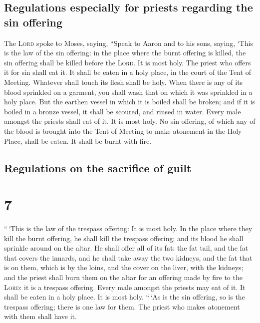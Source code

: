 \hypertarget{regulations-especially-for-priests-regarding-the-sin-offering}{%
\subsection{Regulations especially for priests regarding the sin
offering}\label{regulations-especially-for-priests-regarding-the-sin-offering}}

 The \textsc{Lord} spoke to Moses, saying,
 ``Speak to Aaron and to his sons, saying, `This is the
law of the sin offering: in the place where the burnt offering is
killed, the sin offering shall be killed before the \textsc{Lord}. It is
most holy.  The priest who offers it for sin shall eat
it. It shall be eaten in a holy place, in the court of the Tent of
Meeting.  Whatever shall touch its flesh shall be holy.
When there is any of its blood sprinkled on a garment, you shall wash
that on which it was sprinkled in a holy place.  But the
earthen vessel in which it is boiled shall be broken; and if it is
boiled in a bronze vessel, it shall be scoured, and rinsed in water.
 Every male amongst the priests shall eat of it. It is
most holy.  No sin offering, of which any of the blood is
brought into the Tent of Meeting to make atonement in the Holy Place,
shall be eaten. It shall be burnt with fire.

\hypertarget{regulations-on-the-sacrifice-of-guilt}{%
\subsection{Regulations on the sacrifice of
guilt}\label{regulations-on-the-sacrifice-of-guilt}}

\hypertarget{section-6}{%
\section{7}\label{section-6}}

 ``\,`This is the law of the trespass offering: It is most
holy.  In the place where they kill the burnt offering, he
shall kill the trespass offering; and its blood he shall sprinkle around
on the altar.  He shall offer all of its fat: the fat
tail, and the fat that covers the innards,  and he shall
take away the two kidneys, and the fat that is on them, which is by the
loins, and the cover on the liver, with the kidneys;  and
the priest shall burn them on the altar for an offering made by fire to
the \textsc{Lord}: it is a trespass offering.  Every male
amongst the priests may eat of it. It shall be eaten in a holy place. It
is most holy.  ``\,`As is the sin offering, so is the
trespass offering; there is one law for them. The priest who makes
atonement with them shall have it.

